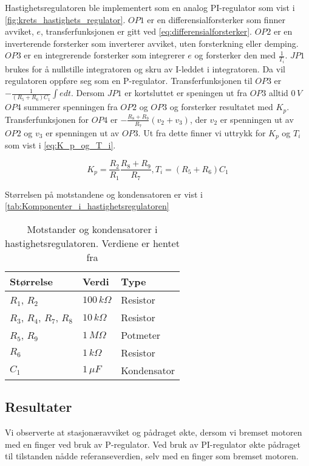 Hastighetsregulatoren ble implementert som en analog PI-regulator som vist i \autoref{fig:krets_hastighets_regulator}. $OP1$ er en differensialforsterker som finner avviket, $e$, transferfunksjonen er gitt ved \autoref{eq:differensialforsterker}.
$OP2$ er en inverterende forsterker som inverterer avviket, uten forsterkning eller demping.
$OP3$ er en integrerende forsterker som integrerer $e$ og forsterker den med $\frac{1}{T_i}$. $JP1$ brukes for å nullstille integratoren og skru av I-leddet i integratoren. Da vil regulatoren oppføre seg som en P-regulator. Transferfunksjonen til $OP3$ er $-\frac{1}{(R_5 + R_6) C_1} \int e dt$. Dersom $JP1$ er kortsluttet er speningen ut fra $OP3$ alltid $0\,V$
$OP4$ summerer spenningen fra $OP2$ og $OP3$ og forsterker resultatet med $K_p$. Transferfunksjonen for $OP4$ er $-\frac{R_8 + R_9}{R_7}(v_2 + v_3)$, der $v_2$ er spenningen ut av $OP2$ og $v_3$ er spenningen ut av $OP3$. Ut fra dette finner vi uttrykk for $K_p$ og $T_i$ som vist i \autoref{eq:K_p_og_T_i}.

\begin{equation}
    \label{eq:K_p_og_T_i}
    K_p = \frac{R_2}{R_1} \frac{R_8 + R_9}{R_7},
    T_i = (R_5 + R_6) C_1
\end{equation}

Størrelsen på motstandene og kondensatoren er vist i \autoref{tab:Komponenter_i_hastighetsregulatoren}

\begin{table}
    \centering
    \caption{Motstander og kondensatorer i hastighetsregulatoren. Verdiene er hentet fra \cite{AnalogMotorlabbOppgaver}}
    \begin{tabular}{lll}
        \toprule
        Størrelse & Verdi & Type \\
		\midrule
        $R_1$, $R_2$ & $100\,k\Omega$ & Resistor\\
        $R_3$, $R_4$, $R_7$, $R_8$ & $10\,k\Omega$ & Resistor \\
        $R_5$, $R_9$ & $1\,M\Omega$ & Potmeter \\
        $R_6$ & $1\,k\Omega$ & Resistor \\
        $C_1$ & $1\,\mu F$ & Kondensator \\
        \bottomrule
    \end{tabular}
    \label{tab:Komponenter_i_hastighetsregulatoren}
\end{table}

\subsection{Resultater}
\label{obs:hastighet_regulator_breming_med_finger}
Vi observerte at stasjonæravviket og pådraget økte, dersom vi bremset motoren med en finger ved bruk av P-regulator. Ved bruk av PI-regulator økte pådraget til tilstanden nådde referanseverdien, selv med en finger som bremset motoren.

